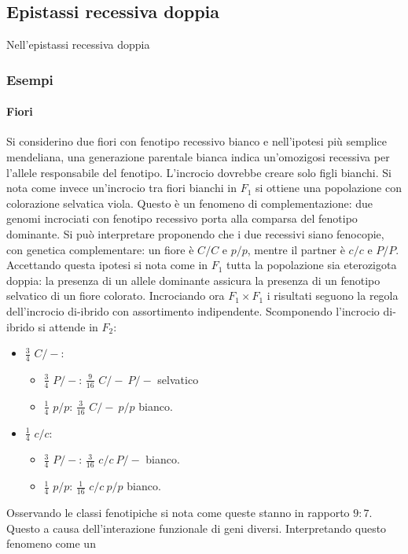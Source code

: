\subsection{Epistassi recessiva doppia}
Nell'epistassi recessiva doppia 
\subsubsection{Esempi}
\paragraph{Fiori}
Si considerino due fiori con fenotipo recessivo bianco e nell'ipotesi pi\`u semplice mendeliana, una generazione parentale bianca indica un'omozigosi recessiva per l'allele responsabile
del fenotipo. L'incrocio dovrebbe creare solo figli bianchi. Si nota come invece un'incrocio tra fiori bianchi in $F_1$ si ottiene una popolazione con colorazione selvatica viola. 
Questo \`e un fenomeno di complementazione: due genomi incrociati con fenotipo recessivo porta alla comparsa del fenotipo dominante. Si pu\`o interpretare proponendo che i due recessivi
siano fenocopie, con genetica complementare: un fiore \`e $C/C$ e $p/p$, mentre il partner \`e $c/c$ e $P/P$. Accettando questa ipotesi si nota come in $F_1$ tutta la popolazione
sia eterozigota doppia: la presenza di un allele dominante assicura la presenza di un fenotipo selvatico di un fiore colorato. Incrociando ora $F_1\times F_1$ i risultati seguono la
regola dell'incrocio di-ibrido con assortimento indipendente. Scomponendo l'incrocio di-ibrido si attende in $F_2$:
\begin{itemize}
	\item $\frac{3}{4}$ $C/-$:
		\begin{itemize}
			\item $\frac{3}{4}$ $P/-$: $\frac{9}{16}$ $C/-\ P/-$ selvatico
			\item $\frac{1}{4}$ $p/p$: $\frac{3}{16}$ $C/-\ p/p$ bianco.
		\end{itemize}
	\item $\frac{1}{4}$ $c/c$:
		\begin{itemize}
			\item $\frac{3}{4}$ $P/-$: $\frac{3}{16}$ $c/c\ P/-$ bianco.
			\item $\frac{1}{4}$ $p/p$: $\frac{1}{16}$ $c/c\ p/p$ bianco.
		\end{itemize}
\end{itemize}
Osservando le classi fenotipiche si nota come queste stanno in rapporto $9:7$. Questo a causa dell'interazione funzionale di geni diversi. Interpretando questo fenomeno come un 
